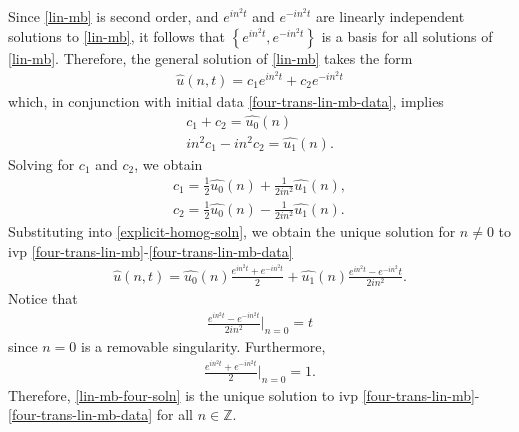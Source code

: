 \documentclass[12pt,reqno]{amsart}
\numberwithin{equation}{section}  %
\numberwithin{figure}{section}
\newcommand{\zz}{\mathbb{Z}}
\newcommand{\wh}{\widehat}
\theoremstyle{plain}
\theoremstyle{definition}
\theoremstyle{remark}
\begin{document}
%
Since
\eqref{lin-mb} is second order, and $e^{in^{2}t}$ and $e^{-in^{2}t}$ are
linearly independent solutions to \eqref{lin-mb}, it follows that $\left\{
e^{in^{2}t}, e^{-in^{2}t}
\right\}$ is a basis for all solutions of \eqref{lin-mb}. Therefore, the general
solution of \eqref{lin-mb} takes the form
%
%
\begin{equation}
  \label{explicit-homog-soln}
\begin{split}
  \wh{u}(n,t) = c_{1}e^{in^{2}t} + c_{2}e^{-in^{2}t}
\end{split}
\end{equation}
%
%
which, in conjunction with initial data 
\eqref{four-trans-lin-mb-data}, implies
%
%
\begin{gather*}
   c_{1} + c_{2} = \wh{u_{0}}(n)
  \\
   in^{2}c_{1} - in^{2}c_{2} = \wh{u_{1}}(n).
\end{gather*}
%
%
Solving for $c_{1}$ and $c_{2}$, we obtain
%
%
\begin{gather*}
  c_{1} = \frac{1}{2} \wh{u_{0}}(n) + \frac{1}{2in^{2}}\wh{u_{1}}(n),
  \\
  c_{2} = \frac{1}{2} \wh{u_{0}}(n) - \frac{1}{2in^{2}}\wh{u_{1}}(n).
\end{gather*}
%
%
Substituting into \eqref{explicit-homog-soln}, we obtain the unique solution for
$n \neq 0$ to
ivp \eqref{four-trans-lin-mb}-\eqref{four-trans-lin-mb-data}
%
%
\begin{equation}
  \label{lin-mb-four-soln}
\begin{split}
  \wh{u}(n, t) = \wh{u_{0}}(n) \frac{e^{in^{2}t} + e^{-in^{2}t}}{2} +
  \wh{u_{1}}(n)\frac{e^{in^{2}t} - e^{-in^{2}}t}{2 i n^{2}}.
\end{split}
\end{equation}
%
%
Notice that 
\begin{equation}
  \label{remov-sing}
\begin{split}
  \frac{e^{in^{2}t} - e^{-in^{2}t}}{2 i n^{2}} \Big |_{n =0} = t
\end{split}
\end{equation}
%
%
since $n=0$ is a removable singularity. Furthermore, 
%
%
\begin{equation*}
\begin{split}
  \frac{e^{in^{2}t} + e^{-in^{2}t}}{2} \Big |_{n = 0} =1.
\end{split}
\end{equation*}
%
%
Therefore, \eqref{lin-mb-four-soln} is the unique solution to ivp
\eqref{four-trans-lin-mb}-\eqref{four-trans-lin-mb-data} for all $n \in \zz$.  
\end{document}
